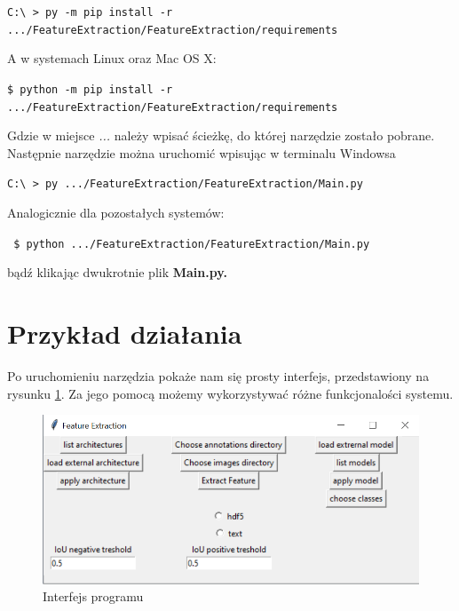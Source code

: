 \documentclass[a4paper,twoside,12pt]{book}
\begin{document}
{{\lstinline|C:\ > py -m pip install -r .../FeatureExtraction/FeatureExtraction/requirements| }

{A w systemach Linux oraz Mac OS X:}


{\lstinline|$ python -m pip install -r .../FeatureExtraction/FeatureExtraction/requirements| }

{Gdzie w miejsce \emph{...} należy wpisać ścieżkę, do której narzędzie zostało pobrane. Następnie narzędzie można uruchomić wpisując w terminalu Windowsa}

{\lstinline|C:\ > py .../FeatureExtraction/FeatureExtraction/Main.py| }

{Analogicznie dla pozostałych systemów:}

{\lstinline| $ python .../FeatureExtraction/FeatureExtraction/Main.py| }

{bądź klikając dwukrotnie plik \textbf{Main.py.}}
\section{Przykład działania}
{Po uruchomieniu narzędzia pokaże nam się prosty interfejs, przedstawiony na rysunku \ref{interface}. Za jego pomocą możemy wykorzystywać różne funkcjonalości systemu.}


\begin{figure}[h!]


\centering
\includegraphics[scale=0.9]{interface.png}
\caption{Interfejs programu}
\label{interface}
\end{figure}

}
\end{document}
